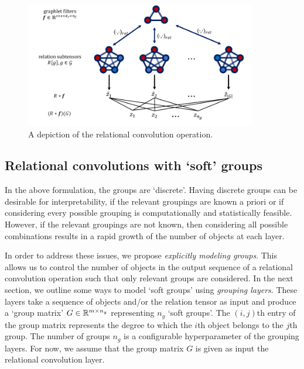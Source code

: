 \begin{figure}[!ht]
    \centering
    \includegraphics[width=0.9\textwidth]{figs/relconv_diagram2.pdf}
    \caption{A depiction of the relational convolution operation.
    }\label{fig:relconvdiagram}
\end{figure}


\subsection{Relational convolutions with `soft' groups}

In the above formulation, the groups are `discrete'. Having discrete groups can be desirable for interpretability, if the relevant groupings are known a priori or if considering every possible grouping is computationally and statistically feasible. However, if the relevant groupings are not known, then considering all possible combinations results in a rapid growth of the number of objects at each layer.

In order to address these issues, we propose \textit{explicitly modeling groups}. This allows us to control the number of objects in the output sequence of a relational convolution operation such that only relevant groups are considered. In the next section, we outline some ways to model `soft groups' using \textit{grouping layers}. These layers take a sequence of objects and/or the relation tensor as input and produce a `group matrix' $G \in \mathbb{R}^{m \times n_g}$ representing $n_g$ `soft groups'. The $(i,j)$th entry of the group matrix represents the degree to which the $i$th object belongs to the $j$th group. The number of groups $n_g$ is a configurable hyperparameter of the grouping layers. For now, we assume that the group matrix $G$ is given as input the relational convolution layer.

